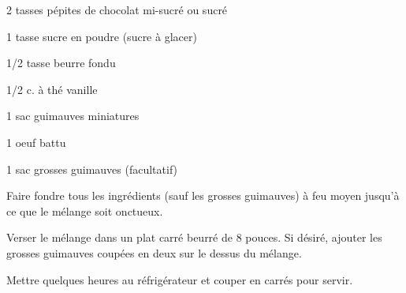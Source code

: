 %
%   
%   
%   
%



\totaltime{}


\begin{ingredients}
    \item 2 tasses pépites de chocolat mi-sucré ou sucré
    \item 1 tasse sucre en poudre (sucre à glacer)
    \item 1/2 tasse beurre fondu
    \item 1/2 c. à thé vanille
    \item 1 sac guimauves miniatures
    \item 1 oeuf battu
    \item 1 sac grosses guimauves (facultatif)
\end{ingredients}

\begin{steps}
    \item Faire fondre tous les ingrédients (sauf les grosses guimauves) à feu moyen jusqu'à ce que le mélange soit onctueux.
    \item Verser le mélange dans un plat carré beurré de 8 pouces. Si désiré, ajouter les grosses guimauves coupées en deux sur le dessus du mélange.
    \item Mettre quelques heures au réfrigérateur et couper en carrés pour servir.
\end{steps}
